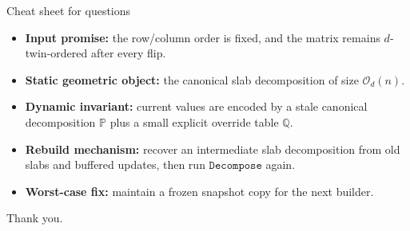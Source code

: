 \documentclass[aspectratio=169,professionalfonts]{beamer}
\newcommand{\Oh}{\mathcal{O}}
\newcommand{\bbP}{\mathbb{P}}
\newcommand{\bbQ}{\mathbb{Q}}
\begin{document}
\begin{frame}[t]{Cheat sheet for questions}
\small
\begin{itemize}
\item \textbf{Input promise:} the row/column order is fixed, and the matrix remains $d$-twin-ordered after every flip.
\item \textbf{Static geometric object:} the canonical slab decomposition of size $\Oh_d(n)$.
\item \textbf{Dynamic invariant:} current values are encoded by a stale canonical decomposition $\bbP$ plus a small explicit override table $\bbQ$.
\item \textbf{Rebuild mechanism:} recover an intermediate slab decomposition from old slabs and buffered updates, then run $\mathtt{Decompose}$ again.
\item \textbf{Worst-case fix:} maintain a frozen snapshot copy for the next builder.
\end{itemize}
\vfill
\begin{center}
\Large Thank you.
\end{center}
\end{frame}
\end{document}
